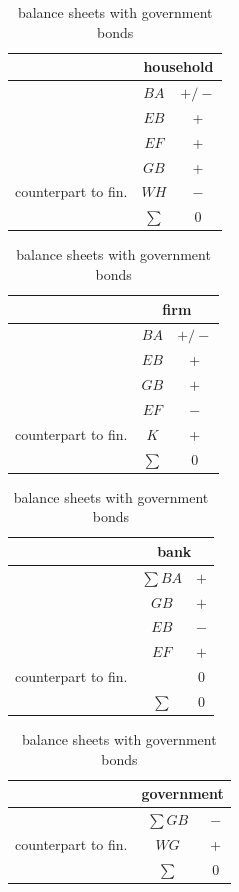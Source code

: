 \documentclass{article}
\begin{document}
\begin{table}[p]
	\begin{center}

	\begin{tabular}{r c c }
	
		&\multicolumn{2}{c}{household}\\
\hline
&$BA$	&	$+/-$  \\
&$EB$	&	+  \\
&$EF$	&	+  \\
&$GB$	&	+  \\
\hline
counterpart to fin. &$WH$	&$-$\\
\hline
&$\sum$	&	0
\end{tabular}
\hskip5mm
\begin{tabular}{r c c}
	& \multicolumn{2}{c}{firm} \\
\hline
&$BA$	&	$+/-$  \\
&$EB$	&	+  \\
&$GB$	&$+$	\\
&$EF$	&$-$	\\
\hline
counterpart to fin.	&$K$	& +	\\
\hline
&$\sum$		&0\\
\end{tabular}
\hskip5mm
\begin{tabular}{r c c}
	& \multicolumn{2}{c}{bank} \\
\hline
&$\sum BA$	&	$+$  \\
&$GB$	&	$+$  \\
&$EB$	&	$-$  \\
&$EF$	&$+$	\\
\hline
counterpart to fin.	&	& 0	\\
\hline
&$\sum$		&0\\
\end{tabular}
\hskip5mm
\begin{tabular}{r c c}
	& \multicolumn{2}{c}{government} \\
\hline
&$\sum GB$	&	$-$  \\
\hline
counterpart to fin.	&$WG$	& +	\\
\hline
&$\sum$		&0\\
\end{tabular}


\end{center}
	\caption{balance sheets with government bonds}
	\label{tab:bsall}
\end{table}
\end{document}
